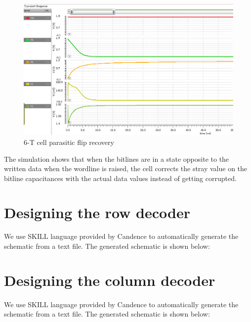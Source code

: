 \begin{figure}[H]
\centering
\includegraphics[width=\textwidth]{6trecovery.png}
\caption{6-T cell parasitic flip recovery}
\label{fig:Figure}
\end{figure}
The simulation shows that when the bitlines are in a state opposite to the written data when the wordline is raised, the cell corrects the stray value on the bitline capacitances with the actual data values instead of getting corrupted.
\section{Designing the row decoder}
\paragraph{}
We use SKILL language provided by Candence to automatically generate the schematic from a text file. The generated schematic is shown below:

\section{Designing the column decoder}
\paragraph{}
We use SKILL language provided by Candence to automatically generate the schematic from a text file. The generated schematic is shown below:

